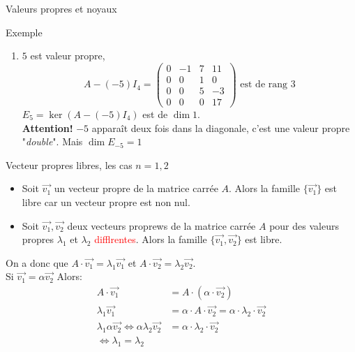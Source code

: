 \begin{parag}{Valeurs propres et noyaux}
\begin{subparag}{Exemple}
\begin{enumerate}
            \item $5$ est valeur propre,
            \[A - (-5)I_4 = \begin{pmatrix}
            0 & -1 & 7 & 11\\
            0 & 0  &1 & 0\\
            0 & 0 & 5 & -3\\
            0 & 0 & 0 & 17
        \end{pmatrix} \text{  est de rang }3\]
        $E_5 = \ker (A - (-5)I_4)$ est de $\dim 1$.
        \\
        \textbf{Attention!} $-5$ apparaît deux fois dans la diagonale, c'est une valeur propre "\textit{double}". Mais $\dim E_{-5} = 1$
        \end{enumerate}
    \end{subparag}
\end{parag}
\begin{parag}{Vecteur propres libres, les cas $n= 1, 2$}
    \begin{itemize}
        \item Soit $\vec{v_1}$ un vecteur propre de la matrice carrée $A$. Alors la famille $\{\vec{v_1}\}$ est libre car un vecteur propre est non nul.
        \item Soit $\vec{v_1}, \vec{v_2}$ deux vecteurs proprews de la matrice carrée $A$ pour des valeurs propres $\lambda_1$ et $\lambda_2$ \textcolor{red}{difflrentes}. Alors la famille $\{\vec{v_1}, \vec{v_2}\}$ est libre.
    \end{itemize}

    On a donc que $A\cdot \vec{v_1} = \lambda_1\vec{v_1}$ et $A\cdot \vec{v_2} = \lambda_2\vec{v_2}$.
    \\
    Si $\vec{v_1} = \alpha \vec{v_2}$ Alors:
    \begin{align*}
        A\cdot\vec{v_1} &= A \cdot(\alpha \cdot \vec{v_2})\\
        \lambda_1\vec{v_1} &= \alpha \cdot A \cdot \vec{v_2} = \alpha \cdot \lambda_2 \cdot\vec{v_2}\\
        \lambda_1\alpha\vec{v_2} \Leftrightarrow \alpha\lambda_2\vec{v_2} &= \alpha \cdot\lambda_2 \cdot \vec{v_2}\\
        \Leftrightarrow \lambda_1 = \lambda_2
    \end{align*}
\end{parag}

